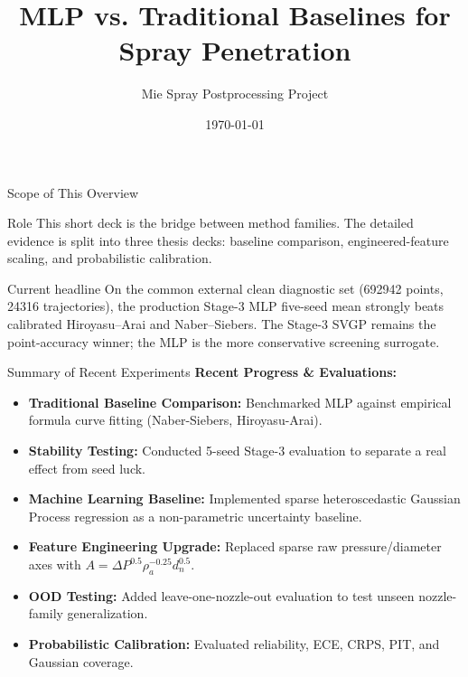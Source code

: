 \documentclass[UTF8,aspectratio=169]{ctexbeamer}
\title[MLP vs Baselines]{MLP vs. Traditional Baselines for Spray Penetration}
\author{Mie Spray Postprocessing Project}
\date{\today}
\begin{document}
\begin{frame}
  \titlepage
\end{frame}

\begin{frame}{Scope of This Overview}
\small
\begin{block}{Role}
This short deck is the bridge between method families. The detailed evidence is
split into three thesis decks: baseline comparison, engineered-feature scaling,
and probabilistic calibration.
\end{block}

\begin{block}{Current headline}
On the common external clean diagnostic set
(\num{692942} points, \num{24316} trajectories), the production Stage-3 MLP
five-seed mean strongly beats calibrated Hiroyasu--Arai and Naber--Siebers.
The Stage-3 SVGP remains the point-accuracy winner; the MLP is the more
conservative screening surrogate.
\end{block}
\end{frame}

\begin{frame}{Summary of Recent Experiments}
\textbf{Recent Progress \& Evaluations:}
\begin{itemize}
    \item \textbf{Traditional Baseline Comparison:} Benchmarked MLP against empirical formula curve fitting (Naber-Siebers, Hiroyasu-Arai).
    \item \textbf{Stability Testing:} Conducted 5-seed Stage-3 evaluation to separate a real effect from seed luck.
    \item \textbf{Machine Learning Baseline:} Implemented sparse heteroscedastic Gaussian Process regression as a non-parametric uncertainty baseline.
    \item \textbf{Feature Engineering Upgrade:} Replaced sparse raw pressure/diameter axes with \(A=\Delta P^{0.5}\rho_a^{-0.25}d_n^{0.5}\).
    \item \textbf{OOD Testing:} Added leave-one-nozzle-out evaluation to test unseen nozzle-family generalization.
    \item \textbf{Probabilistic Calibration:} Evaluated reliability, ECE, CRPS, PIT, and Gaussian coverage.
\end{itemize}
\end{frame}
\end{document}

